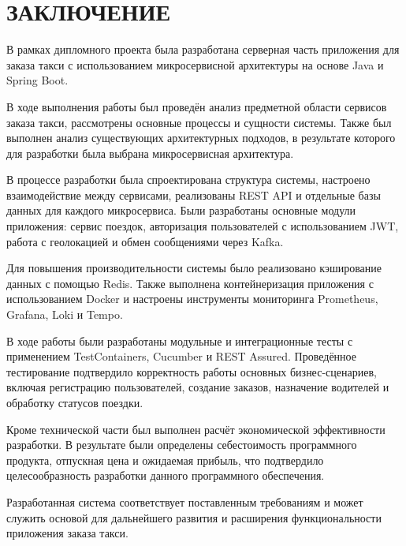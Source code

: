 \sectionbreak 
\section*{
	\gostTitleFont
	\redline
	ЗАКЛЮЧЕНИЕ
}

\subtitlespace

{\gostFont
	\par \redline В рамках дипломного проекта была разработана серверная часть приложения для заказа такси с использованием микросервисной архитектуры на основе Java и Spring Boot.
	
	\par \redline В ходе выполнения работы был проведён анализ предметной области сервисов заказа такси, рассмотрены основные процессы и сущности системы. Также был выполнен анализ существующих архитектурных подходов, в результате которого для разработки была выбрана микросервисная архитектура.
	
	\par \redline В процессе разработки была спроектирована структура системы, настроено взаимодействие между сервисами, реализованы REST API и отдельные базы данных для каждого микросервиса. Были разработаны основные модули приложения: сервис поездок, авторизация пользователей с использованием JWT, работа с геолокацией и обмен сообщениями через Kafka.
	
	\par \redline Для повышения производительности системы было реализовано кэширование данных с помощью Redis. Также выполнена контейнеризация приложения с использованием Docker и настроены инструменты мониторинга Prometheus, Grafana, Loki и Tempo.
	
	\par \redline В ходе работы были разработаны модульные и интеграционные тесты с применением TestContainers, Cucumber и REST Assured. Проведённое тестирование подтвердило корректность работы основных бизнес-сценариев, включая регистрацию пользователей, создание заказов, назначение водителей и обработку статусов поездки.
	
	\par \redline Кроме технической части был выполнен расчёт экономической эффективности разработки. В результате были определены себестоимость программного продукта, отпускная цена и ожидаемая прибыль, что подтвердило целесообразность разработки данного программного обеспечения.
	
	\par \redline Разработанная система соответствует поставленным требованиям и может служить основой для дальнейшего развития и расширения функциональности приложения заказа такси.
	
}

\setcounter{subchaptercntr}{1}
\setcounter{formulacntr}{1}
\setcounter{imagecntr}{1}